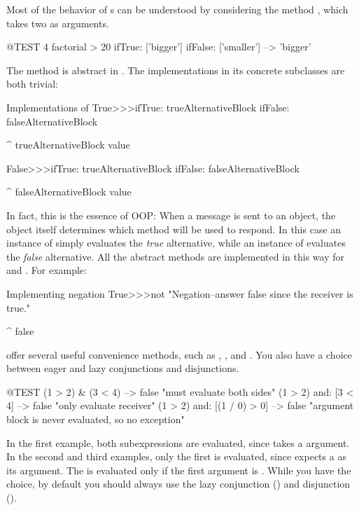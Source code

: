 \documentclass[a4paper,10pt,twoside]{book}
\begin{document}
Most of the behavior of s can be understood by considering the method , which takes two  as arguments.

\begin{code}{@TEST}
4 factorial > 20 ifTrue: ['bigger'] ifFalse: ['smaller'] --> 'bigger'
\end{code}

The method is abstract in .
The implementations in its concrete subclasses are both trivial:

\begin{method}{Implementations of }
True>>>ifTrue: trueAlternativeBlock ifFalse: falseAlternativeBlock

    ^ trueAlternativeBlock value


False>>>ifTrue: trueAlternativeBlock ifFalse: falseAlternativeBlock

    ^ falseAlternativeBlock value
\end{method}

In fact, this is the essence of OOP:
When a message is sent to an object, the object itself determines which method will be used to respond.
In this case an instance of  simply evaluates the \emph{true} alternative, while an instance of  evaluates the \emph{false} alternative.
All the abstract  methods are implemented in this way for  and .
For example:

\begin{method}{Implementing negation}
True>>>not
    "Negation--answer false since the receiver is true."

    ^ false
\end{method}

 offer several useful convenience methods, such as , , and .
You also have a choice between eager and lazy conjunctions and disjunctions.

\begin{code}{@TEST}
(1 > 2) & (3 < 4)              --> false    "must evaluate both sides"
(1 > 2) and: [3 < 4]        --> false    "only evaluate receiver"
(1 > 2) and: [(1 / 0) > 0] --> false    "argument block is never evaluated, so no exception"
\end{code}

In the first example, both  subexpressions are evaluated, since  takes a  argument.
In the second and third examples, only the first is evaluated, since  expects a  as its argument.
The  is evaluated only if the first argument is .
While you have the choice, by default you should always use the lazy conjunction () and disjunction ().
\end{document}
